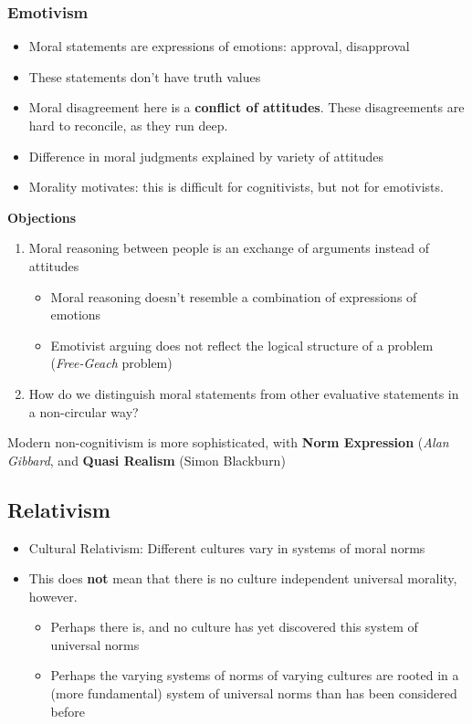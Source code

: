 \documentclass{article}
\begin{document}
        \subsubsection{Emotivism}
        \begin{itemize}
            \item Moral statements are expressions of emotions: approval, disapproval
            \item These statements don't have truth values
            \item Moral disagreement here is a \textbf{conflict of attitudes}. These disagreements are hard to reconcile, as they run deep.
            \item Difference in moral judgments explained by variety of attitudes
            \item Morality motivates: this is difficult for cognitivists, but not for emotivists.
        \end{itemize}{}
        \bigbreak \textbf{Objections}
        \begin{enumerate}
            \item Moral reasoning between people is an exchange of arguments instead of attitudes
            \begin{itemize}
                \item Moral reasoning doesn't resemble a combination of expressions of emotions
                \item Emotivist arguing does not reflect the logical structure of a problem (\textit{Free-Geach} problem)
            \end{itemize}{}
            \item How do we distinguish moral statements from other evaluative statements in a non-circular way?
        \end{enumerate}{}
        Modern non-cognitivism is more sophisticated, with \textbf{Norm Expression} (\textit{Alan Gibbard}, and \textbf{Quasi Realism} (Simon Blackburn)
    
    \subsection{Relativism}
    \begin{itemize}
        \item Cultural Relativism: Different cultures vary in systems of moral norms
        \item This does \textbf{not} mean that there is no culture independent universal morality, however.
        \begin{itemize}
            \item Perhaps there is, and no culture has yet discovered this system of universal norms
            \item Perhaps the varying systems of norms of varying cultures are rooted in a (more fundamental) system of universal norms than has been considered before
        \end{itemize}{}
    \end{itemize}{}
\end{document}
